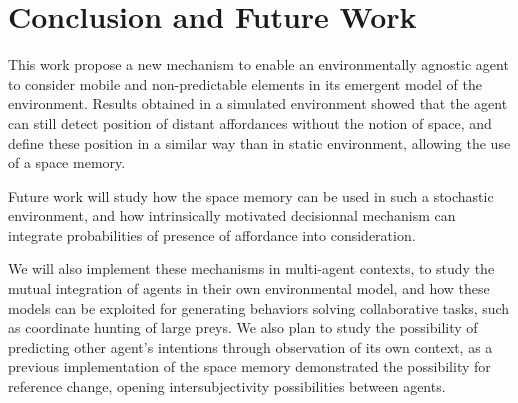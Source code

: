 \documentclass[conference]{IEEEtran}
\begin{document}
\section{Conclusion and Future Work}

This work propose a new mechanism to enable an environmentally agnostic agent to consider mobile and non-predictable elements in its emergent model of the environment. Results obtained in a simulated environment showed that the agent can still detect position of distant affordances without the notion of space, and define these position in a similar way than in static environment, allowing the use of a space memory.

Future work will study how the space memory can be used in such a stochastic environment, and how intrinsically motivated decisionnal mechanism can integrate probabilities of presence of affordance into consideration.

We will also implement these mechanisms in multi-agent contexts, to study the mutual integration of agents in their own environmental model, and how these models can be exploited for generating behaviors solving collaborative tasks, such as coordinate hunting of large preys. We also plan to study the possibility of predicting other agent's intentions through observation of its own context, as a previous implementation of the space memory demonstrated the possibility for reference change, opening intersubjectivity possibilities between agents.





\end{document}
